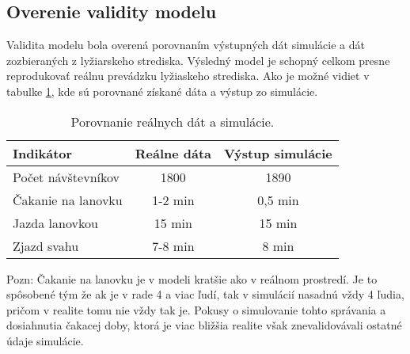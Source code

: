 \subsection{Overenie validity modelu}
Validita modelu bola overená porovnaním výstupných dát simulácie a dát zozbieraných z lyžiarskeho strediska.
Výsledný model je schopný celkom presne reprodukovať reálnu prevádzku lyžiaskeho strediska. Ako je možné vidiet v tabulke \ref{tab:validity}, 
kde sú porovnané získané dáta a výstup zo simulácie.
\begin{table}[h!]
  \centering
  \begin{tabular}{@{}lcc@{}}
  \toprule
  Indikátor &  Reálne dáta  & Výstup simulácie \\ \midrule
  Počet návštevníkov & 1800 &  1890 \\
  Čakanie na lanovku & 1-2 min &  0,5 min \\
  Jazda lanovkou & 15 min &  15 min \\
  Zjazd svahu & 7-8 min & 8 min \\
  \bottomrule
  \end{tabular}
  \caption{Porovnanie reálnych dát a simulácie.}
  \label{tab:validity}
  \end{table}
Pozn: Čakanie na lanovku je v modeli kratšie ako v reálnom prostredí. Je to spôsobené tým že ak je v rade 4 a viac ľudí,
tak v simulácií nasadnú vždy 4 ľudia, pričom v realite tomu nie vždy tak je. Pokusy o simulovanie tohto správania a dosiahnutia
čakacej doby, ktorá je viac bližšia realite však znevalidovávali ostatné údaje simulácie.


